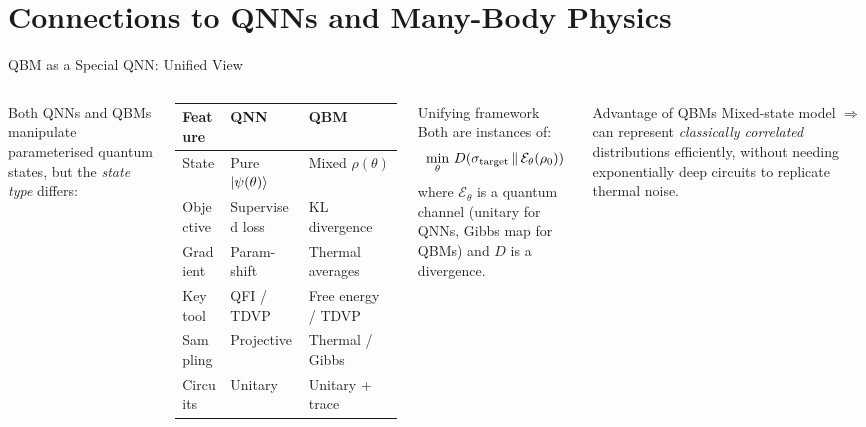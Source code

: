 \documentclass[aspectratio=169,10pt]{beamer}
\begin{document}
\section{Connections to QNNs and Many-Body Physics}

\begin{frame}{QBM as a Special QNN: Unified View}
  \begin{columns}[T]
      Both QNNs and QBMs manipulate parameterised quantum states,
      but the \emph{state type} differs:

      \vspace{0.3cm}
      \renewcommand{\arraystretch}{1.3}
      \begin{tabular}{p{1.8cm}p{2.5cm}p{2.5cm}}
        \toprule
        Feature & QNN & QBM \\
        \midrule
        State & Pure $\ket{\psi(\theta)}$ & Mixed $\rho(\theta)$ \\
        Objective & Supervised loss & KL divergence \\
        Gradient & Param-shift & Thermal averages \\
        Key tool & QFI / TDVP & Free energy / TDVP \\
        Sampling & Projective & Thermal / Gibbs \\
        Circuits & Unitary & Unitary + trace \\
        \bottomrule
      \end{tabular}
      \begin{block}{Unifying framework}
        Both are instances of:
        \[
          \min_\theta\, D(\sigma_{\rm target}\,\|\,\mathcal{E}_\theta(\rho_0))
        \]
        where $\mathcal{E}_\theta$ is a quantum channel
        (unitary for QNNs, Gibbs map for QBMs) and
        $D$ is a divergence.
      \end{block}
      \vspace{0.2cm}
      \begin{alertblock}{Advantage of QBMs}
        Mixed-state model $\Rightarrow$ can represent
        \emph{classically correlated} distributions
        efficiently, without needing exponentially deep
        circuits to replicate thermal noise.
      \end{alertblock}
  \end{columns}
\end{frame}
\end{document}
